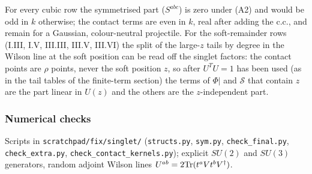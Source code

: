 \documentclass[10pt]{article}
\begin{document}
For every cubic row the symmetrised part ($S^{abc}$) is zero under (A2) and would be odd in $k$ otherwise; the contact terms are even in $k$, real after adding the c.c., and remain for a Gaussian, colour-neutral projectile. For the soft-remainder rows (I.III, I.V, III.III, III.V, III.VI) the split of the large-$z$ tails by degree in the Wilson line at the soft position can be read off the singlet factors: the contact points are $\rho$ points, never the soft position $z$, so after $U^{T}U=1$ has been used (as in the tail tables of the finite-term section) the terms of $\Phi|$ and $\mathcal{S}$ that contain $z$ are the part linear in $U(z)$ and the others are the $z$-independent part.

\subsubsection{Numerical checks}\label{sec:s-checks}
\noindent Scripts in \texttt{scratchpad/fix/singlet/} (\texttt{structs.py}, \texttt{sym.py}, \texttt{check\_final.py}, \texttt{check\_extra.py}, \texttt{check\_contact\_kernels.py}); explicit $SU(2)$ and $SU(3)$ generators, random adjoint Wilson lines $U^{ab}=2{\rm Tr}(t^{a}Vt^{b}V^{\dagger})$.
\end{document}
